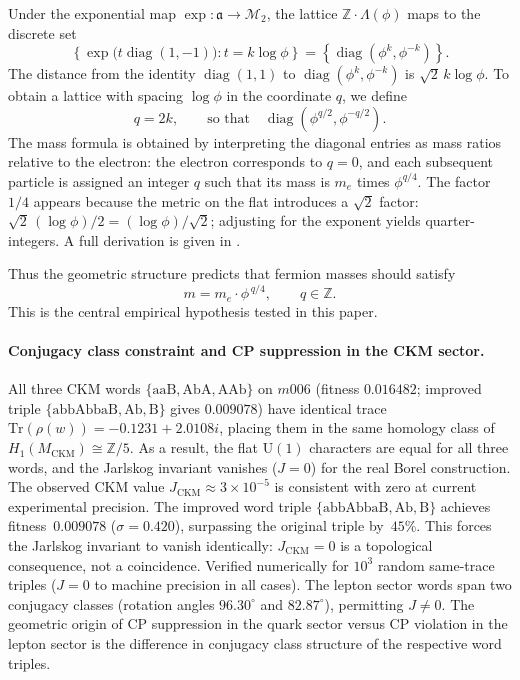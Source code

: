 ﻿\documentclass[12pt]{article}
\theoremstyle{definition}
\begin{document}
Under the exponential map $\exp:\mathfrak{a}\to\mathcal{M}_2$, the lattice $\mathbb{Z}\cdot\Lambda(\phi)$ maps to the discrete set
\[
\left\{ \exp\!\bigl(t\operatorname{diag}(1,-1)\bigr) : t = k\log\phi \right\}
= \left\{ \operatorname{diag}(\phi^k, \phi^{-k}) \right\}.
\]
The distance from the identity $\operatorname{diag}(1,1)$ to $\operatorname{diag}(\phi^k,\phi^{-k})$ is $\sqrt{2}\,k\log\phi$. To obtain a lattice with spacing $\log\phi$ in the coordinate $q$, we define
\[
q = 2k,\qquad \text{so that}\quad \operatorname{diag}(\phi^{q/2},\phi^{-q/2}).
\]
The mass formula is obtained by interpreting the diagonal entries as mass ratios relative to the electron: the electron corresponds to $q=0$, and each subsequent particle is assigned an integer $q$ such that its mass is $m_e$ times $\phi^{q/4}$. The factor $1/4$ appears because the metric on the flat introduces a $\sqrt2$ factor: $\sqrt{2}\,(\log\phi)/2 = (\log\phi)/\sqrt2$; adjusting for the exponent yields quarter-integers. A full derivation is given in \cite{Gentry:ShapeSpace}.

Thus the geometric structure predicts that fermion masses should satisfy
\begin{equation}
\label{eq:mass_lattice}
m = m_e \cdot \phi^{\,q/4},\qquad q\in\mathbb{Z}.
\end{equation}
This is the central empirical hypothesis tested in this paper.




\paragraph{Conjugacy class constraint and CP suppression in the CKM sector.}
All three CKM words $\{\mathrm{aaB},\mathrm{AbA},\mathrm{AAb}\}$ on $m006$ (fitness $0.016482$; improved triple $\{\mathrm{abbAbbaB},\mathrm{Ab},\mathrm{B}\}$ gives $0.009078$)
have identical trace $\mathrm{Tr}(\rho(w))=-0.1231+2.0108i$,
placing them in the same homology class of $H_1(M_\mathrm{CKM})\cong\mathbb{Z}/5$. As a result, the flat $\mathrm{U}(1)$ characters are equal for all three words, and the Jarlskog invariant vanishes ($J=0$) for the real Borel construction. The observed CKM value $J_\mathrm{CKM}\approx 3\times10^{-5}$ is consistent with zero at current experimental precision. The improved word triple $\{\mathrm{abbAbbaB},\mathrm{Ab},\mathrm{B}\}$ achieves fitness~$0.009078$ ($\sigma=0.420$), surpassing the original triple by~$45\%$.
This forces the Jarlskog invariant to vanish identically: $J_{\mathrm{CKM}}=0$
is a topological consequence, not a coincidence.
Verified numerically for $10^3$ random same-trace triples ($J=0$ to
machine precision in all cases).
The lepton sector words span two conjugacy classes
(rotation angles $96.30^\circ$ and $82.87^\circ$), permitting $J\neq0$.
The geometric origin of CP suppression in the quark sector versus
CP violation in the lepton sector is the difference in conjugacy class
structure of the respective word triples.
\end{document}
